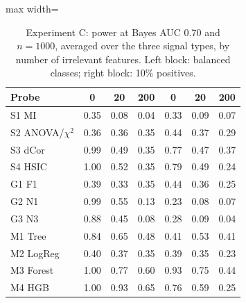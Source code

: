 \begin{table}[!t]
\centering
\caption{Experiment C: power at Bayes AUC 0.70 and $n=1000$, averaged over the three signal types, by number of irrelevant features. Left block: balanced classes; right block: 10\% positives.}
\label{tab:robust}
\footnotesize
\begin{adjustbox}{max width=\linewidth}
\begin{tabular}{lcccccc}
\hline
Probe & 0 & 20 & 200 & 0  & 20  & 200  \\ \hline
S1 MI & 0.35 & 0.08 & 0.04 & 0.33 & 0.09 & 0.07 \\
S2 ANOVA/$\chi^2$ & 0.36 & 0.36 & 0.35 & 0.44 & 0.37 & 0.29 \\
S3 dCor & 0.99 & 0.49 & 0.35 & 0.77 & 0.47 & 0.37 \\
S4 HSIC & 1.00 & 0.52 & 0.35 & 0.79 & 0.49 & 0.24 \\
G1 F1 & 0.39 & 0.33 & 0.35 & 0.44 & 0.36 & 0.25 \\
G2 N1 & 0.99 & 0.55 & 0.13 & 0.23 & 0.08 & 0.07 \\
G3 N3 & 0.88 & 0.45 & 0.08 & 0.28 & 0.09 & 0.04 \\
M1 Tree & 0.84 & 0.65 & 0.48 & 0.41 & 0.53 & 0.41 \\
M2 LogReg & 0.40 & 0.37 & 0.35 & 0.39 & 0.35 & 0.23 \\
M3 Forest & 1.00 & 0.77 & 0.60 & 0.93 & 0.75 & 0.44 \\
M4 HGB & 1.00 & 0.93 & 0.65 & 0.76 & 0.59 & 0.25 \\
\hline
\end{tabular}
\end{adjustbox}
\end{table}
